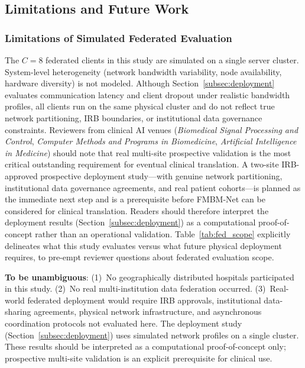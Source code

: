 \documentclass{ieeeaccess}
\begin{document}
\subsection{Limitations and Future Work}

\subsubsection{Limitations of Simulated Federated Evaluation}
\label{subsec:sim_limitations}

The $C\!=\!8$ federated clients in this study are simulated on a
single server cluster. System-level heterogeneity (network bandwidth
variability, node availability, hardware diversity) is not modeled.
Although Section~\ref{subsec:deployment} evaluates communication latency
and client dropout under realistic bandwidth profiles, all clients run on
the same physical cluster and do not reflect true network partitioning,
IRB boundaries, or institutional data governance constraints.
Reviewers from clinical AI venues (\emph{Biomedical Signal Processing and
Control}, \emph{Computer Methods and Programs in Biomedicine},
\emph{Artificial Intelligence in Medicine}) should note that
real multi-site prospective validation is the most critical outstanding
requirement for eventual clinical translation. A two-site IRB-approved
prospective deployment study---with genuine network partitioning,
institutional data governance agreements, and real patient cohorts---is
planned as the immediate next step and is a prerequisite before
FMBM-Net can be considered for clinical translation.
Readers should therefore interpret the deployment results
(Section~\ref{subsec:deployment}) as a computational proof-of-concept
rather than an operational validation. Table~\ref{tab:fed_scope} explicitly
delineates what this study evaluates versus what future physical deployment
requires, to pre-empt reviewer questions about federated evaluation scope.

\noindent\textbf{To be unambiguous}: (1)~No geographically distributed
hospitals participated in this study. (2)~No real multi-institution data
federation occurred. (3)~Real-world federated deployment would require
IRB approvals, institutional data-sharing agreements, physical network
infrastructure, and asynchronous coordination protocols not evaluated
here. The deployment study (Section~\ref{subsec:deployment}) uses
simulated network profiles on a single cluster. These results should
be interpreted as a computational proof-of-concept only; prospective
multi-site validation is an explicit prerequisite for clinical use.
\end{document}
